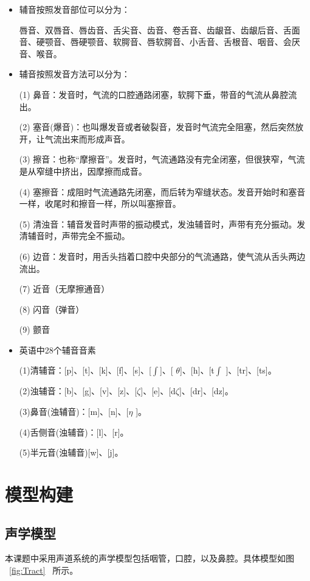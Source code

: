 \begin{itemize}
\item 辅音按照发音部位可以分为：


唇音、双唇音、唇齿音、舌尖音、齿音、卷舌音、齿龈音、齿龈后音、舌面音、硬颚音、唇硬颚音、软腭音、唇软腭音、小舌音、舌根音、咽音、会厌音、喉音。
\item 辅音按照发音方法可以分为：


(1)	鼻音：发音时，气流的口腔通路闭塞，软腭下垂，带音的气流从鼻腔流出。


(2)	塞音(爆音)：也叫爆发音或者破裂音，发音时气流完全阻塞，然后突然放开，让气流出来而形成声音。


(3)	擦音：也称“摩擦音”。发音时，气流通路没有完全闭塞，但很狭窄，气流是从窄缝中挤出，因摩擦而成音。


(4)	塞擦音：成阻时气流通路先闭塞，而后转为窄缝状态。发音开始时和塞音一样，收尾时和擦音一样，所以叫塞擦音。


(5)	清浊音：辅音发音时声带的振动模式，发浊辅音时，声带有充分振动。发清辅音时，声带完全不振动。


(6)	边音：发音时，用舌头挡着口腔中央部分的气流通路，使气流从舌头两边流出。


(7)	近音（无摩擦通音）


(8)	闪音（弹音）


(9)	颤音


\item 英语中28个辅音音素


(1)清辅音：[p]、[t]、[k]、[f]、[s]、[$\int$]、[ $\theta$]、[h]、[t$\int$ ]、[tr]、[ts]。


(2)浊辅音：[b]、[g]、[v]、[z]、[$\zeta$]、[e]、[d$\zeta$]、[dr]、[dz]。


(3)鼻音(浊辅音)：[m]、[n]、[$\eta$ ]。


(4)舌侧音(浊辅音)：[l]、[r]。


(5)半元音(浊辅音)[w]、[j]。

\end{itemize}

\chapter{模型构建}
\section{声学模型}
本课题中采用声道系统的声学模型包括咽管，口腔，以及鼻腔。具体模型如图 ~\ref{fig:Tract}~ 所示。


